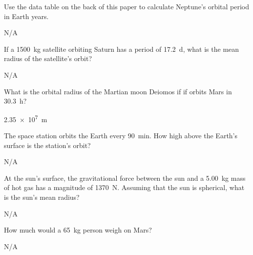 \begin{question}[ID=gravity-B-Q02,topic=gravity,difficulty=B]
    Use the data table on the back of this paper to calculate Neptune’s orbital period in Earth years.
\end{question}
\begin{solution}
    N/A
\end{solution}


\begin{question}[ID=gravity-B-Q03,topic=gravity,difficulty=B]
    If a \SI{1500}{\kilo\gram} satellite orbiting Saturn has a period
        of \SI{17.2}{\day}, what is the mean radius of the satellite's
        orbit?
\end{question}
\begin{solution}
    N/A
\end{solution}


\begin{question}[ID=gravity-B-Q04,topic=gravity,difficulty=B]
    What is the orbital radius of the Martian moon Deiomos if
        if orbits Mars in \SI{30.3}{\hour}?
\end{question}
\begin{solution}
    \SI{2.35e7}{\meter}
\end{solution}


\begin{question}[ID=gravity-B-Q05,topic=gravity,difficulty=B]
    The space station orbits the Earth every \SI{90}{\minute}.
    How high above the Earth's surface is the station's orbit?
\end{question}
\begin{solution}
    N/A
\end{solution}


\begin{question}[ID=gravity-C-Q01,topic=gravity,difficulty=C]
    At the sun's surface, the gravitational force between the
        sun and a \SI{5.00}{\kilo\gram} mass of hot gas has 
        a magnitude of \SI{1370}{\newton}.
    Assuming that the sun is spherical, what is the sun's
        mean radius?
\end{question}
\begin{solution}
    N/A
\end{solution}


\begin{question}[ID=gravity-C-Q02,topic=gravity,difficulty=C]
    How much would a \SI{65}{\kilo\gram} person weigh on Mars?
\end{question}
\begin{solution}
    N/A
\end{solution}


